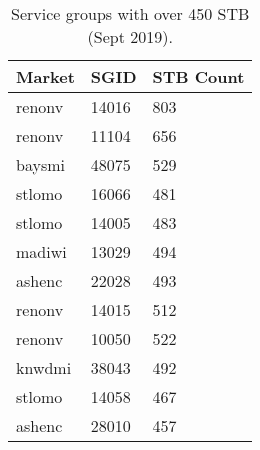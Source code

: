 \documentclass{article}
\begin{document}
\begin{table}[h]
\centering
\begin{tabular}{|l|l|l|} 
\hline Market & SGID & STB Count \\
\hline renonv & 14016 & 803 \\  
\hline renonv & 11104 & 656 \\
\hline baysmi & 48075 & 529 \\
\hline stlomo & 16066 & 481 \\
\hline stlomo & 14005 & 483 \\
\hline madiwi & 13029 & 494 \\
\hline ashenc & 22028 & 493 \\
\hline renonv & 14015 & 512 \\
\hline renonv & 10050 & 522 \\
\hline knwdmi & 38043 & 492 \\
\hline stlomo & 14058 & 467 \\
\hline ashenc & 28010 & 457 \\
\hline
\end{tabular}
\caption{\label{TABLE-HighSGUse} Service groups with over 450 STB (Sept 2019).} 
\end{table}
\end{document}
